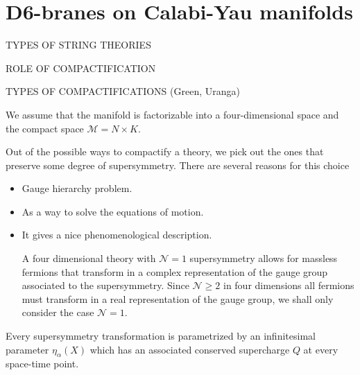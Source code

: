 \chapter{D6-branes on Calabi-Yau manifolds}

TYPES OF STRING THEORIES



ROLE OF COMPACTIFICATION



TYPES OF COMPACTIFICATIONS (Green, Uranga)


We assume that the manifold is factorizable into a four-dimensional space and the compact space
$\mathcal M =  N\times K$.



Out of the possible ways to compactify a theory, we pick out the ones that preserve some
degree of supersymmetry.
There are several reasons for this choice
\begin{itemize}
  \item Gauge hierarchy problem.
  \item As a way to solve the equations of motion.
  \item It gives a nice phenomenological description.

    A four dimensional theory with $\mathcal N=1$ supersymmetry allows for massless fermions
    that transform in a complex representation of the gauge group associated to the supersymmetry.
    Since $\mathcal N\geq 2$ in four dimensions all fermions must transform in a real representation 
    of the gauge group, we shall only consider the case $\mathcal N=1$.

\end{itemize}

Every supersymmetry transformation is parametrized by an infinitesimal parameter $\eta_\alpha (X)$
which has an associated conserved supercharge $Q$ at every space-time point.

